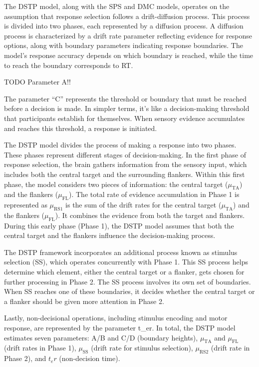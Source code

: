 \documentclass[
  man]{apa7}
\begin{document}
The DSTP model, along with the SPS and DMC models, operates on the assumption that response selection follows a drift-diffusion process. This process is divided into two phases, each represented by a diffusion process. A diffusion process is characterized by a drift rate parameter reflecting evidence for response options, along with boundary parameters indicating response boundaries. The model's response accuracy depends on which boundary is reached, while the time to reach the boundary corresponds to RT.

TODO Parameter A!!

The parameter ``C'' represents the threshold or boundary that must be reached before a decision is made. In simpler terms, it's like a decision-making threshold that participants establish for themselves. When sensory evidence accumulates and reaches this threshold, a response is initiated.

The DSTP model divides the process of making a response into two phases. These phases represent different stages of decision-making. In the first phase of response selection, the brain gathers information from the sensory input, which includes both the central target and the surrounding flankers. Within this first phase, the model considers two pieces of information: the central target (\(\mu_{\text{TA}}\)) and the flankers (\(\mu_{\text{FL}}\)). The total rate of evidence accumulation in Phase 1 is represented as \(\mu_{\text{RS1}}\) is the sum of the drift rates for the central target (\(\mu_{\text{TA}}\)) and the flankers (\(\mu_{\text{FL}}\)). It combines the evidence from both the target and flankers. During this early phase (Phase 1), the DSTP model assumes that both the central target and the flankers influence the decision-making process.

The DSTP framework incorporates an additional process known as stimulus selection (SS), which operates concurrently with Phase 1. This SS process helps determine which element, either the central target or a flanker, gets chosen for further processing in Phase 2. The SS process involves its own set of boundaries. When SS reaches one of these boundaries, it decides whether the central target or a flanker should be given more attention in Phase 2.

Lastly, non-decisional operations, including stimulus encoding and motor response, are represented by the parameter t\_er. In total, the DSTP model estimates seven parameters: A/B and C/D (boundary heights), \(\mu_{\text{TA}}\) and \(\mu_{\text{FL}}\) (drift rates in Phase 1), \(\mu_{\text{SS}}\) (drift rate for stimulus selection), \(\mu_{\text{RS2}}\) (drift rate in Phase 2), and \(t_er\) (non-decision time).
\end{document}
